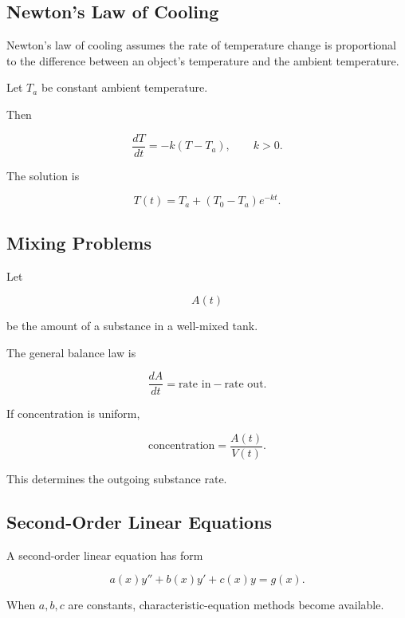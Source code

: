 \subsection{Newton's Law of Cooling}
\label{subsec:newtons-law-cooling}

Newton's law of cooling assumes the rate of temperature change is
proportional to the difference between an object's temperature and the
ambient temperature.

Let \(T_a\) be constant ambient temperature.

Then

\[
\boxed{
\frac{dT}{dt}
=
-k
(
T-T_a
),
\qquad
k>0.
}
\]

The solution is

\[
\boxed{
T(t)
=
T_a
+
(
T_0-T_a
)
e^{-kt}.
}
\]

\subsection{Mixing Problems}
\label{subsec:mixing-problems}

Let

\[
A(t)
\]

be the amount of a substance in a well-mixed tank.

The general balance law is

\[
\boxed{
\frac{dA}{dt}
=
\text{rate in}
-
\text{rate out}.
}
\]

If concentration is uniform,

\[
\boxed{
\text{concentration}
=
\frac{
A(t)
}{
V(t)
}.
}
\]

This determines the outgoing substance rate.

\subsection{Second-Order Linear Equations}
\label{subsec:second-order-linear-odes}

A second-order linear equation has form

\[
\boxed{
a(x)y''
+
b(x)y'
+
c(x)y
=
g(x).
}
\]

When \(a,b,c\) are constants, characteristic-equation methods become
available.

